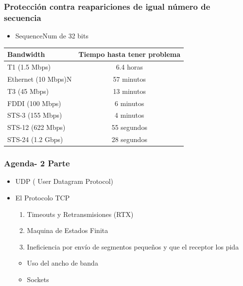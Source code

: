 \documentclass{beamer}
\begin{document}
\begin{frame}
	\frametitle{Protección contra reapariciones de igual número de secuencia}
	\begin{itemize}
	\item SequenceNum de 32 bits
\end{itemize}
	\begin{table}[]
		\begin{tabular}{|l|c|}
			\hline
			\textbf{Bandwidth}&\textbf{Tiempo hasta tener problema}  \\ \hline
			
			T1 (1.5 Mbps)&6.4 horas  \\ \hline
			
			Ethernet (10 Mbps)N&57 minutos  \\ \hline
			
			T3 (45 Mbps)&13 minutos \\ \hline
			
			FDDI (100 Mbps)&6 minutos \\ \hline
		
			STS-3 (155 Mbps)&4 minutos \\ \hline
			
			STS-12 (622 Mbps)& 55 segundos\\ \hline
			
			STS-24 (1.2 Gbps)& 28 segundos \\ \hline
		
		\end{tabular}
	\end{table}
\end{frame}
\begin{frame}
	\frametitle{Agenda- 2 Parte}
	\begin{itemize}
		\item UDP ( User Datagram Protocol)
		\item El Protocolo TCP
		\begin{enumerate}
			\item Timeouts y Retransmisiones (RTX)
			\item Maquina de Estados Finita
			\item Ineficiencia por envío de segmentos pequeños y
			que el receptor los pida
		\end{enumerate}

		\begin{itemize}
			\item Uso del ancho de banda
			\item Sockets
		\end{itemize}
	\end{itemize}
\end{frame}
\end{document}
